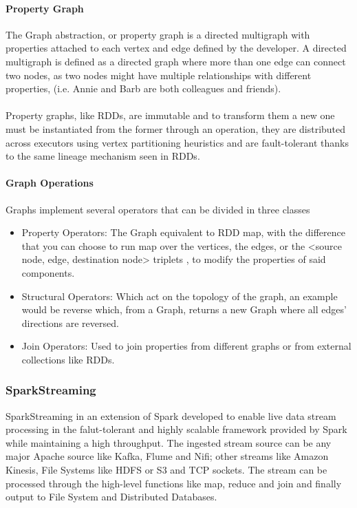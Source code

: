 \paragraph{Property Graph}

The Graph abstraction, or property graph is a directed multigraph with properties attached to each vertex and edge defined by the developer. A directed multigraph is defined as a directed graph where more than one edge can connect two nodes, as two nodes might have multiple relationships with different properties, (i.e. Annie and Barb are both colleagues and friends). \\ \\
Property graphs, like RDDs, are immutable and to transform them a new one must be instantiated from the former through an operation, they are distributed across executors using vertex partitioning heuristics and are fault-tolerant thanks to the same lineage mechanism seen in RDDs.

\paragraph{Graph Operations}

Graphs implement several operators that can be divided in three classes

\begin{itemize}
	\item Property Operators: The Graph equivalent to RDD map, with the difference that you can choose to run map over the vertices, the edges, or the <source node, edge, destination node> triplets , to modify the properties of said components.
	\item Structural Operators: Which act on the topology of the graph, an example would be reverse which, from a Graph, returns a new Graph where all edges' directions are reversed.
	\item Join Operators: Used to join properties from different graphs or from external collections like RDDs.
\end{itemize}


\subsubsection{SparkStreaming}

SparkStreaming in an extension of Spark developed to enable live data stream processing in the falut-tolerant and highly scalable framework provided by Spark while maintaining a high throughput.
The ingested stream source can be any major Apache source like Kafka, Flume and Nifi; other streams like Amazon Kinesis, File Systems like HDFS or S3 and TCP sockets.
The stream can be processed through the high-level functions like map, reduce and join and finally output to File System and Distributed Databases.


